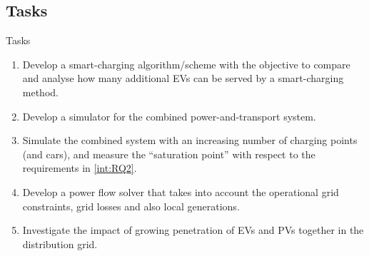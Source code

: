 \documentclass[aspectratio=169]{beamer}
\begin{document}
\subsection{Tasks}
		\begin{frame}{Tasks}
\begin{enumerate}[label=\textbf{Task {\arabic*}.},ref=Task {\arabic*}.]
\item<1-> \label{int:task1} Develop a smart-charging algorithm/scheme with the objective to compare and analyse how many additional EVs can be served by a smart-charging method.
\item<2-> \label{int:task2} Develop a simulator for the combined power-and-transport system.
\item<3-> \label{int:task3} Simulate the combined system with an increasing number of charging points (and cars), and measure the ``saturation point'' with respect to the requirements in \ref{int:RQ2}.
\item<4-> \label{int:task4} Develop a power flow solver that takes into account the operational grid constraints, grid losses and also local generations.
\item<5-> \label{int:task5} Investigate the impact of growing penetration of EVs and PVs together in the distribution grid.
\end{enumerate}
\end{frame}	
\end{document}
